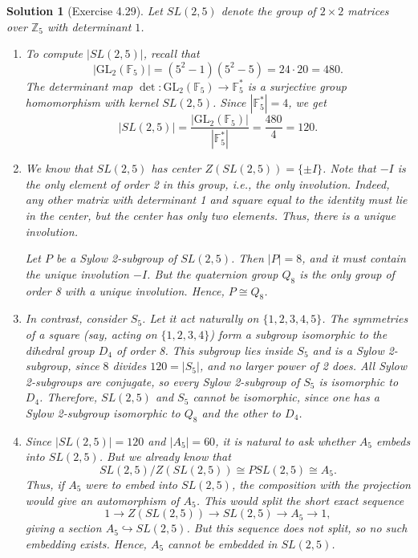 \documentclass{article}
\newtheorem{solution}{Solution} %
\begin{document}
\begin{solution}[Exercise 4.29]
    Let $SL(2, 5)$ denote the group of $2 \times 2$ matrices over $\mathbb{Z}_5$ with determinant $1$.

    \begin{enumerate}
        \item[(i)] To compute $|SL(2,5)|$, recall that
        \[
        |\mathrm{GL}_2(\mathbb{F}_5)| = (5^2 - 1)(5^2 - 5) = 24 \cdot 20 = 480.
        \]
        The determinant map $\det: \mathrm{GL}_2(\mathbb{F}_5) \to \mathbb{F}_5^*$ is a surjective group homomorphism with kernel $SL(2,5)$. Since $|\mathbb{F}_5^*| = 4$, we get
        \[
        |SL(2,5)| = \frac{|\mathrm{GL}_2(\mathbb{F}_5)|}{|\mathbb{F}_5^*|} = \frac{480}{4} = 120.
        \]

        \item[(ii)] We know that $SL(2,5)$ has center $Z(SL(2,5)) = \{\pm I\}$. Note that $-I$ is the only element of order 2 in this group, i.e., the only involution. Indeed, any other matrix with determinant 1 and square equal to the identity must lie in the center, but the center has only two elements. Thus, there is a unique involution.

        Let $P$ be a Sylow 2-subgroup of $SL(2,5)$. Then $|P| = 8$, and it must contain the unique involution $-I$. But the quaternion group $Q_8$ is the only group of order 8 with a unique involution. Hence, $P \cong Q_8$.

        \item[(iii)] In contrast, consider $S_5$. Let it act naturally on $\{1,2,3,4,5\}$. The symmetries of a square (say, acting on $\{1,2,3,4\}$) form a subgroup isomorphic to the dihedral group $D_4$ of order 8. This subgroup lies inside $S_5$ and is a Sylow 2-subgroup, since $8$ divides $120 = |S_5|$, and no larger power of 2 does. All Sylow 2-subgroups are conjugate, so every Sylow 2-subgroup of $S_5$ is isomorphic to $D_4$. Therefore, $SL(2,5)$ and $S_5$ cannot be isomorphic, since one has a Sylow 2-subgroup isomorphic to $Q_8$ and the other to $D_4$.

        \item[(iv)] Since $|SL(2,5)| = 120$ and $|A_5| = 60$, it is natural to ask whether $A_5$ embeds into $SL(2,5)$. But we already know that
        \[
        SL(2,5)/Z(SL(2,5)) \cong PSL(2,5) \cong A_5.
        \]
        Thus, if $A_5$ were to embed into $SL(2,5)$, the composition with the projection would give an automorphism of $A_5$. This would split the short exact sequence
        \[
        1 \to Z(SL(2,5)) \to SL(2,5) \to A_5 \to 1,
        \]
        giving a section $A_5 \hookrightarrow SL(2,5)$. But this sequence does not split, so no such embedding exists. Hence, $A_5$ cannot be embedded in $SL(2,5)$.
    \end{enumerate}
\end{solution}
\end{document}
